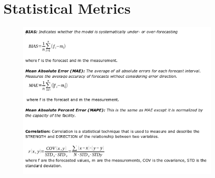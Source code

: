 \chapter{Statistical Metrics}\label{appB:metrics}

\begin{figure}[h!]
\includegraphics[width=0.9\textwidth]{figures/metrics.png}
\label{fig:figure2}
\end{figure}
